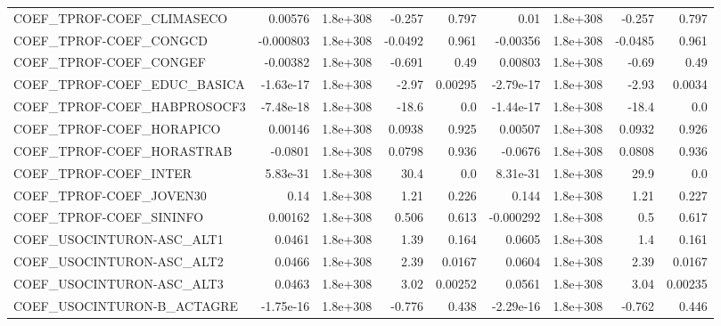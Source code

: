 \begin{tabular}{lrrrrrrrr}
COEF\_TPROF-COEF\_CLIMASECO         &     0.00576 &     1.8e+308 &    -0.257 &    0.797 &       0.01 &    1.8e+308 &       -0.257 &         0.797 \\
COEF\_TPROF-COEF\_CONGCD            &   -0.000803 &     1.8e+308 &   -0.0492 &    0.961 &   -0.00356 &    1.8e+308 &      -0.0485 &         0.961 \\
COEF\_TPROF-COEF\_CONGEF            &    -0.00382 &     1.8e+308 &    -0.691 &     0.49 &    0.00803 &    1.8e+308 &        -0.69 &          0.49 \\
COEF\_TPROF-COEF\_EDUC\_BASICA       &   -1.63e-17 &     1.8e+308 &     -2.97 &  0.00295 &  -2.79e-17 &    1.8e+308 &        -2.93 &        0.0034 \\
COEF\_TPROF-COEF\_HABPROSOCF3       &   -7.48e-18 &     1.8e+308 &     -18.6 &      0.0 &  -1.44e-17 &    1.8e+308 &        -18.4 &           0.0 \\
COEF\_TPROF-COEF\_HORAPICO          &     0.00146 &     1.8e+308 &    0.0938 &    0.925 &    0.00507 &    1.8e+308 &       0.0932 &         0.926 \\
COEF\_TPROF-COEF\_HORASTRAB         &     -0.0801 &     1.8e+308 &    0.0798 &    0.936 &    -0.0676 &    1.8e+308 &       0.0808 &         0.936 \\
COEF\_TPROF-COEF\_INTER             &    5.83e-31 &     1.8e+308 &      30.4 &      0.0 &   8.31e-31 &    1.8e+308 &         29.9 &           0.0 \\
COEF\_TPROF-COEF\_JOVEN30           &        0.14 &     1.8e+308 &      1.21 &    0.226 &      0.144 &    1.8e+308 &         1.21 &         0.227 \\
COEF\_TPROF-COEF\_SININFO           &     0.00162 &     1.8e+308 &     0.506 &    0.613 &  -0.000292 &    1.8e+308 &          0.5 &         0.617 \\
COEF\_USOCINTURON-ASC\_ALT1         &      0.0461 &     1.8e+308 &      1.39 &    0.164 &     0.0605 &    1.8e+308 &          1.4 &         0.161 \\
COEF\_USOCINTURON-ASC\_ALT2         &      0.0466 &     1.8e+308 &      2.39 &   0.0167 &     0.0604 &    1.8e+308 &         2.39 &        0.0167 \\
COEF\_USOCINTURON-ASC\_ALT3         &      0.0463 &     1.8e+308 &      3.02 &  0.00252 &     0.0561 &    1.8e+308 &         3.04 &       0.00235 \\
COEF\_USOCINTURON-B\_ACTAGRE        &   -1.75e-16 &     1.8e+308 &    -0.776 &    0.438 &  -2.29e-16 &    1.8e+308 &       -0.762 &         0.446 \\

\end{tabular}
